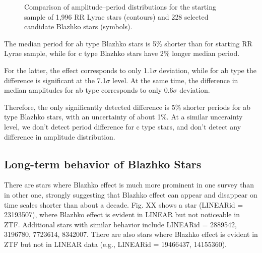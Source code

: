 \begin{figure}[ht]
    \centering
    \caption{Comparison of amplitude--period distributions for the starting sample of 1,996 RR Lyrae stars (contours)
        and 228 selected candidate Blazhko stars (symbols).}
      \label{fig:AmplPeriod}
\end{figure}

The median period for ab type Blazhko stars is 5\% shorter than for starting
RR Lyrae sample, while for c type Blazhko stars have 2\% longer median period. 

For the latter, the effect corresponds to only 1.1$\sigma$ deviation, while for ab type the
difference is significant at the 7.1$\sigma$ level. At the same time, the difference in
median amplitudes for ab type corresponds to only 0.6$\sigma$ deviation. 

Therefore, the only significantly detected difference is 5\% shorter periods for
ab type Blazhko stars, with an uncertainty of about 1\%. At a similar uncerainty level,
we don't detect period difference for c type stars, and don't detect any difference
in amplitude distribution. 



\subsection{Long-term behavior of Blazhko Stars}


There are stars where Blazhko effect is much more prominent in one survey than in other one,
strongly suggesting that Blazhko effect can appear and disappear on time scales shorter than
about a decade. Fig. XX shows a star (LINEARid = 23193507), where Blazhko effect is evident in LINEAR but not noticeable
in ZTF. Additional stars with similar behavior include LINEARid = 2889542, 3196780, 7723614, 8342007.
There are also stars where Blazhko effect is evident in ZTF but not in LINEAR data (e.g., LINEARid = 19466437, 14155360). 




